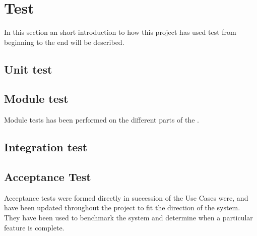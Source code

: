 
\chapter{Test}
In this section an short introduction to how this project has used test from beginning to the end will be described.

\section{Unit  test}


\section{Module test}
Module tests has been performed on the different parts of the \systemName.

\section{Integration test}


\section{Acceptance Test}
Acceptance tests were formed directly in succession of the Use Cases were, and have been updated throughout the project to fit the direction of the system. They have been used to benchmark the system and determine when a particular feature is complete.

\FloatBarrier
